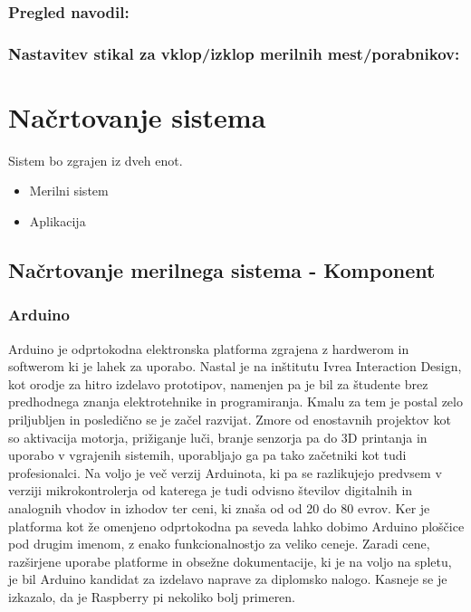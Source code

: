 \documentclass[12pt,a4paper,titlepage,openany]{report}
\begin{document}
\subsection{Pregled navodil:}

\subsection{Nastavitev stikal za vklop/izklop merilnih mest/porabnikov:}

\chapter{Načrtovanje sistema}
\thispagestyle{fancy}

Sistem bo zgrajen iz dveh enot. 
\begin{itemize}
\item Merilni sistem
\item Aplikacija
\end{itemize}

\section{Načrtovanje merilnega sistema - Komponent}

\subsection{Arduino}
Arduino je odprtokodna elektronska platforma zgrajena z hardwerom in softwerom ki je lahek za uporabo. Nastal je na inštitutu Ivrea Interaction Design, kot orodje za hitro izdelavo prototipov, namenjen pa je bil za študente brez predhodnega znanja elektrotehnike in programiranja. Kmalu za tem je postal zelo priljubljen in posledično se je začel razvijat. Zmore od enostavnih projektov kot so aktivacija motorja, prižiganje luči, branje senzorja pa do 3D printanja in uporabo v vgrajenih sistemih, uporabljajo ga pa tako začetniki kot tudi profesionalci. Na voljo je več verzij Arduinota, ki pa se razlikujejo predvsem v verziji mikrokontrolerja od katerega je tudi odvisno številov digitalnih in analognih vhodov in izhodov ter ceni, ki znaša od od 20 do 80 evrov. Ker je platforma kot že omenjeno odprtokodna pa seveda lahko dobimo Arduino ploščice pod drugim imenom, z enako funkcionalnostjo za veliko ceneje. Zaradi cene, razširjene uporabe platforme in obsežne dokumentacije, ki je na voljo na spletu, je bil Arduino kandidat za izdelavo naprave za diplomsko nalogo. Kasneje se je izkazalo, da je Raspberry pi nekoliko bolj     primeren.
\end{document}
